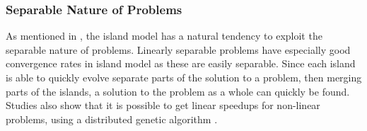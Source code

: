 
\subsubsection{Separable Nature of Problems}
\label{iga:Separable_nature_of_problems}
As mentioned in \cite{IGA:separability_popuplation_size_and_convergence}, the island model has a natural tendency to exploit the separable nature of problems. Linearly separable problems have especially good convergence rates in island model as these are easily separable. Since each island is able to quickly evolve separate parts of the solution to a problem, then merging parts of the islands, a solution to the problem as a whole can quickly be found. Studies also show that it is possible to get linear speedups for non-linear problems, using a distributed genetic algorithm \cite{IGA:non-linear-optimization-problem}.

